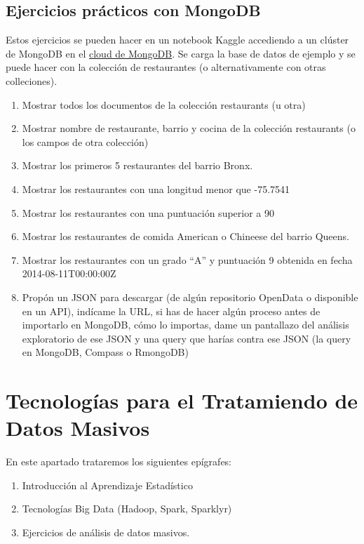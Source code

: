 \documentclass[
]{book}
\theoremstyle{break}
\theoremstyle{nonumberplain}
\begin{document}
\section{Ejercicios prácticos con MongoDB}\label{ejercicios-pruxe1cticos-con-mongodb}

Estos ejercicios se pueden hacer en un notebook Kaggle accediendo a un clúster de MongoDB en el \href{https://cloud.mongodb.com}{cloud de MongoDB}. Se carga la base de datos de ejemplo y se puede hacer con la colección de restaurantes (o alternativamente con otras colleciones).

\begin{enumerate}
\def\labelenumi{\arabic{enumi}.}
\item
  Mostrar todos los documentos de la colección restaurants (u otra)
\item
  Mostrar nombre de restaurante, barrio y cocina de la colección restaurants (o los campos de otra colección)
\item
  Mostrar los primeros 5 restaurantes del barrio Bronx.
\item
  Mostrar los restaurantes con una longitud menor que -75.7541
\item
  Mostrar los restaurantes con una puntuación superior a 90
\item
  Mostrar los restaurantes de comida American o Chineese del barrio Queens.
\item
  Mostrar los restaurantes con un grado ``A'' y puntuación 9 obtenida en fecha 2014-08-11T00:00:00Z
\item
  Propón un JSON para descargar (de algún repositorio OpenData o disponible en un API), indícame la URL, si has de hacer algún proceso antes de importarlo en MongoDB, cómo lo importas, dame un pantallazo del análisis exploratorio de ese JSON y una query que harías contra ese JSON (la query en MongoDB, Compass o RmongoDB)
\end{enumerate}

\chapter{Tecnologías para el Tratamiendo de Datos Masivos}\label{tecnologuxedas-para-el-tratamiendo-de-datos-masivos}

En este apartado trataremos los siguientes epígrafes:

\begin{enumerate}
\def\labelenumi{\arabic{enumi}.}
\item
  Introducción al Aprendizaje Estadístico
\item
  Tecnologías Big Data (Hadoop, Spark, Sparklyr)
\item
  Ejercicios de análisis de datos masivos.
\end{enumerate}
\end{document}
